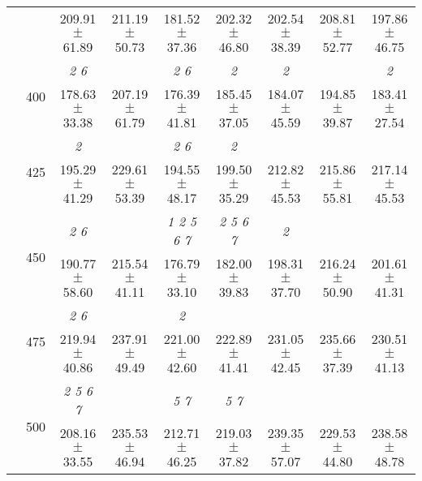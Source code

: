 \begin{table}[h]
{\begin{tabular}{
        ccccccccc}
 & & \cellcolor[HTML]{EFEFEF} 209.91 $\pm$ 61.89& \cellcolor[HTML]{EFEFEF} 211.19 $\pm$ 50.73& \cellcolor[HTML]{EFEFEF} 181.52 $\pm$ 37.36& \cellcolor[HTML]{EFEFEF} 202.32 $\pm$ 46.80& \cellcolor[HTML]{EFEFEF} 202.54 $\pm$ 38.39& \cellcolor[HTML]{EFEFEF} 208.81 $\pm$ 52.77& \cellcolor[HTML]{EFEFEF} 197.86 $\pm$ 46.75 \\ 
 & \multirow{2}{*}{400}& \textit{ 2 6 }& & \textit{ 2 6 }& \textit{ 2 }& \textit{ 2 }& & \textit{ 2 } \\ 
 & & 178.63 $\pm$ 33.38& 207.19 $\pm$ 61.79& 176.39 $\pm$ 41.81& 185.45 $\pm$ 37.05& 184.07 $\pm$ 45.59& 194.85 $\pm$ 39.87& 183.41 $\pm$ 27.54 \\ 
 & \multirow{2}{*}{425}& \cellcolor[HTML]{EFEFEF} \textit{ 2 }& \cellcolor[HTML]{EFEFEF} & \cellcolor[HTML]{EFEFEF} \textit{ 2 6 }& \cellcolor[HTML]{EFEFEF} \textit{ 2 }& \cellcolor[HTML]{EFEFEF} & \cellcolor[HTML]{EFEFEF} & \cellcolor[HTML]{EFEFEF}  \\ 
 & & \cellcolor[HTML]{EFEFEF} 195.29 $\pm$ 41.29& \cellcolor[HTML]{EFEFEF} 229.61 $\pm$ 53.39& \cellcolor[HTML]{EFEFEF} 194.55 $\pm$ 48.17& \cellcolor[HTML]{EFEFEF} 199.50 $\pm$ 35.29& \cellcolor[HTML]{EFEFEF} 212.82 $\pm$ 45.53& \cellcolor[HTML]{EFEFEF} 215.86 $\pm$ 55.81& \cellcolor[HTML]{EFEFEF} 217.14 $\pm$ 45.53 \\ 
 & \multirow{2}{*}{450}& \textit{ 2 6 }& & \textit{ 1 2 5 6 7 }& \textit{ 2 5 6 7 }& \textit{ 2 }& &  \\ 
 & & 190.77 $\pm$ 58.60& 215.54 $\pm$ 41.11& 176.79 $\pm$ 33.10& 182.00 $\pm$ 39.83& 198.31 $\pm$ 37.70& 216.24 $\pm$ 50.90& 201.61 $\pm$ 41.31 \\ 
 & \multirow{2}{*}{475}& \cellcolor[HTML]{EFEFEF} \textit{ 2 6 }& \cellcolor[HTML]{EFEFEF} & \cellcolor[HTML]{EFEFEF} \textit{ 2 }& \cellcolor[HTML]{EFEFEF} & \cellcolor[HTML]{EFEFEF} & \cellcolor[HTML]{EFEFEF} & \cellcolor[HTML]{EFEFEF}  \\ 
 & & \cellcolor[HTML]{EFEFEF} 219.94 $\pm$ 40.86& \cellcolor[HTML]{EFEFEF} 237.91 $\pm$ 49.49& \cellcolor[HTML]{EFEFEF} 221.00 $\pm$ 42.60& \cellcolor[HTML]{EFEFEF} 222.89 $\pm$ 41.41& \cellcolor[HTML]{EFEFEF} 231.05 $\pm$ 42.45& \cellcolor[HTML]{EFEFEF} 235.66 $\pm$ 37.39& \cellcolor[HTML]{EFEFEF} 230.51 $\pm$ 41.13 \\ 
 & \multirow{2}{*}{500}& \textit{ 2 5 6 7 }& & \textit{ 5 7 }& \textit{ 5 7 }& & &  \\ 
 & & 208.16 $\pm$ 33.55& 235.53 $\pm$ 46.94& 212.71 $\pm$ 46.25& 219.03 $\pm$ 37.82& 239.35 $\pm$ 57.07& 229.53 $\pm$ 44.80& 238.58 $\pm$ 48.78 \\ 

\end{tabular}}
\end{table}
